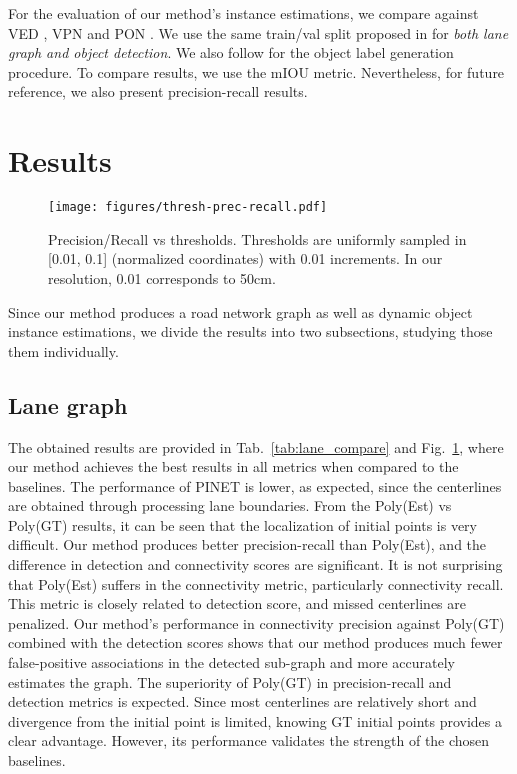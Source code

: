 \documentclass[10pt,twocolumn,letterpaper]{article}
\begin{document}
For the evaluation of our method's instance estimations, we compare against VED \cite{DBLP:journals/ral/LuMD19}, VPN \cite{DBLP:journals/ral/PanSLAZ20} and PON \cite{DBLP:conf/cvpr/RoddickC20}. We use the same train/val split proposed in \cite{DBLP:conf/cvpr/RoddickC20} for \emph{both lane graph and object detection}. We also follow \cite{DBLP:conf/cvpr/RoddickC20} for the object label generation procedure. To compare results, we use the mIOU metric. Nevertheless, for future reference, we also present precision-recall results.   



\section{Results}


\begin{figure}
    \centering
    \texttt{[image: figures/thresh-prec-recall.pdf]}
    \caption{Precision/Recall vs thresholds. Thresholds are uniformly sampled in [0.01, 0.1] (normalized coordinates) with 0.01 increments. In our resolution, 0.01 corresponds to 50cm.}
    \label{fig:prec-recall}
\end{figure}
Since our method produces a road network graph as well as dynamic object instance estimations, we divide the results into two subsections, studying those them individually.

\subsection{Lane graph}

The obtained results are provided in Tab.~\ref{tab:lane_compare} and Fig.~\ref{fig:prec-recall}, where our method achieves the best results in all metrics when compared to the baselines. The performance of PINET is lower, as expected, since the centerlines are obtained through processing lane boundaries. From the Poly(Est) vs Poly(GT) results, it can be seen that the localization of initial points is very difficult. Our method produces better precision-recall than Poly(Est), and the difference in detection and connectivity scores are significant. It is not surprising that Poly(Est) suffers in the connectivity metric, particularly connectivity recall. This metric is closely related to detection score, and missed centerlines are penalized. Our method's performance in connectivity precision against Poly(GT) combined with the detection scores shows that our method produces much fewer false-positive associations in the detected sub-graph and more accurately estimates the graph. The superiority of Poly(GT) in precision-recall and detection metrics is expected. Since most centerlines are relatively short and divergence from the initial point is limited, knowing GT initial points provides a clear advantage. However, its performance validates the strength of the  chosen baselines. 
\end{document}
